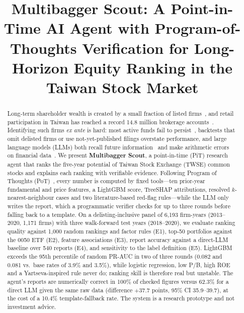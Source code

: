 \documentclass[conference]{IEEEtran}
\begin{document}
\title{Multibagger Scout: A Point-in-Time AI Agent with Program-of-Thoughts Verification for Long-Horizon Equity Ranking in the Taiwan Stock Market}

\author{
}

\maketitle

\begin{abstract}
Long-term shareholder wealth is created by a small fraction of listed firms~\cite{b2,b1}, and retail participation in Taiwan has reached a record 14.8 million brokerage accounts~\cite{b11}.
Identifying such firms \emph{ex ante} is hard: most active funds fail to persist~\cite{b3}, backtests that omit delisted firms or use not-yet-published filings overstate performance, and large language models (LLMs) both recall future information~\cite{b5,b6,b7} and make arithmetic errors on financial data~\cite{b8}.
We present \textbf{Multibagger Scout}, a point-in-time (PiT) research agent that ranks the five-year potential of Taiwan Stock Exchange (TWSE) common stocks and explains each ranking with verifiable evidence.
Following Program of Thoughts (PoT)~\cite{b4}, every number is computed by fixed tools---ten prior-year fundamental and price features, a LightGBM score, TreeSHAP attributions, resolved $k$-nearest-neighbour cases and two literature-based red-flag rules---while the LLM only writes the report, which a programmatic verifier checks for up to three rounds before falling back to a template.
On a delisting-inclusive panel of 6,193 firm-years (2013--2020, 1,171 firms) with three walk-forward test years (2018--2020), we evaluate ranking quality against 1,000 random rankings and factor rules (E1), top-50 portfolios against the 0050 ETF (E2), feature associations (E3), report accuracy against a direct-LLM baseline over 540 reports (E4), and sensitivity to the label definition (E5).
LightGBM exceeds the 95th percentile of random PR-AUC in two of three rounds (0.082 and 0.081 vs.\ base rates of 3.9\% and 3.5\%), while logistic regression, low P/B, high ROE and a Yartseva-inspired rule never do; ranking skill is therefore real but unstable. The agent's reports are numerically correct in 100\% of checked figures versus 62.3\% for a direct LLM given the same raw data (difference $+37.7$ points, 95\% CI 35.9--39.7), at the cost of a 10.4\% template-fallback rate. The system is a research prototype and not investment advice.
\end{abstract}
\end{document}
